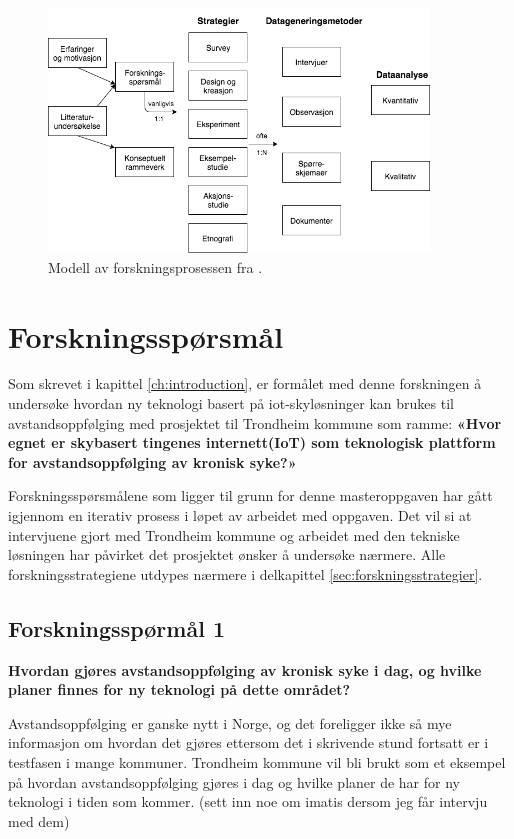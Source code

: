 \begin{figure}
\centering
\includegraphics[width=0.90\textwidth]{fig/oates/oates_research_norwegian}
\caption{Modell av forskningsprosessen fra \citet{oates}.}
\label{fig:oates_model}
\end{figure}

\section{Forskningsspørsmål}
Som skrevet i kapittel \ref{ch:introduction}, er formålet med denne forskningen å undersøke hvordan ny teknologi basert
på \gls{iot}-skyløsninger kan brukes til avstandsoppfølging med prosjektet til Trondheim kommune som ramme:
\textbf{«Hvor egnet er skybasert tingenes internett(IoT) som teknologisk plattform for avstandsoppfølging av kronisk syke?»}

Forskningsspørsmålene som ligger til grunn for denne masteroppgaven har gått igjennom en iterativ prosess i løpet av arbeidet med oppgaven. Det vil
si at intervjuene gjort med Trondheim kommune og arbeidet med den tekniske løsningen har påvirket det prosjektet ønsker å undersøke nærmere. Alle forskningsstrategiene
utdypes nærmere i delkapittel \ref{sec:forskningsstrategier}.

\subsection{Forskningsspørmål 1}
\textbf{Hvordan gjøres avstandsoppfølging av kronisk syke i dag, og hvilke planer finnes for ny teknologi på dette området?}

Avstandsoppfølging er ganske nytt i Norge, og det foreligger ikke så mye informasjon om hvordan det gjøres ettersom
det i skrivende stund fortsatt er i testfasen i mange kommuner. Trondheim kommune vil bli brukt som et eksempel på hvordan avstandsoppfølging
gjøres i dag og hvilke planer de har for ny teknologi i tiden som kommer. (sett inn noe om imatis dersom jeg får intervju med dem)

